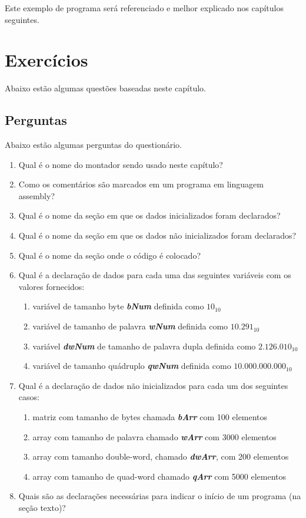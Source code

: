 Este exemplo de programa será referenciado e melhor explicado nos capítulos seguintes.

\section{Exercícios}
Abaixo estão algumas questões baseadas neste capítulo.

\subsection{Perguntas}
Abaixo estão algumas perguntas do questionário.
\begin{enumerate}
	\item Qual é o nome do montador sendo usado neste capítulo?
	\item Como os comentários são marcados em um programa em linguagem assembly?
	\item Qual é o nome da seção em que os dados inicializados foram declarados?
	\item Qual é o nome da seção em que os dados não inicializados foram declarados?
	\item Qual é o nome da seção onde o código é colocado?
	\item Qual é a declaração de dados para cada uma das seguintes variáveis com os valores fornecidos:
	\begin{enumerate}
		\item  variável de tamanho byte \textbf{\textit{bNum}} definida como $10_{10}$
		\item variável de tamanho de palavra \textbf{\textit{wNum}} definida como $10.291_{10}$
		\item variável \textbf{\textit{dwNum}} de tamanho de palavra dupla definida como $2.126.010_{10}$
		\item variável de tamanho quádruplo \textbf{\textit{qwNum} } definida como $10.000.000.000_{10}$
	\end{enumerate}
    \item Qual é a declaração de dados não inicializados para cada um dos seguintes casos:    
    \begin{enumerate}
    	\item matriz com tamanho de bytes chamada \textbf{\textit{bArr}} com 100 elementos
    	\item array com tamanho de palavra chamado \textbf{\textit{wArr} }com 3000 elementos
    	\item array com tamanho double-word, chamado \textbf{\textit{dwArr}}, com 200 elementos
    	\item array com tamanho de quad-word chamado \textbf{\textit{qArr}} com 5000 elementos
    \end{enumerate}
    \item Quais são as declarações necessárias para indicar o início de um programa (na seção texto)?

\end{enumerate}

